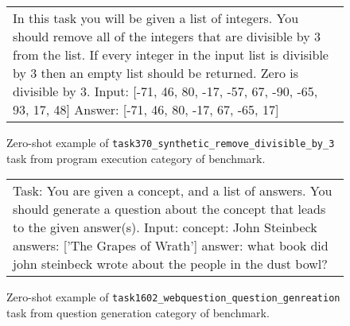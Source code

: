 \begin{figure}[h]
\centering
\begin{tabular}{p{}}
\cellcolor{oldlace} In this task you will be given a list of integers. You should remove all of the integers that are divisible by 3 from the list. If every integer in the input list is divisible by 3 then an empty list should be returned. Zero is divisible by 3.\vspace{1pt} \newline Input: [-71, 46, 80, -17, -57, 67, -90, -65, 93, 17, 48]\vspace{1pt} \newline Answer: \textcolor{cadmiumgreen}{[-71, 46, 80, -17, 67, -65, 17]} \\
\end{tabular}
\caption{Zero-shot example of \texttt{task370\_synthetic\_remove\_divisible\_by\_3} task from program execution category of \natins benchmark.}
\end{figure}




\begin{figure}[h]
\centering
\begin{tabular}{p{}}
\cellcolor{oldlace} Task: You are given a concept, and a list of answers. You should generate a question about the concept that leads to the given answer(s).\vspace{1pt} \newline Input: concept: John Steinbeck  answers:  ['The Grapes of Wrath']\vspace{1pt} \newline answer: \textcolor{cadmiumgreen}{what book did john steinbeck wrote about the people in the dust bowl?} \\
\end{tabular}
\caption{Zero-shot example of \texttt{task1602\_webquestion\_question\_genreation} task from question generation category of \natins benchmark.}
\end{figure}





